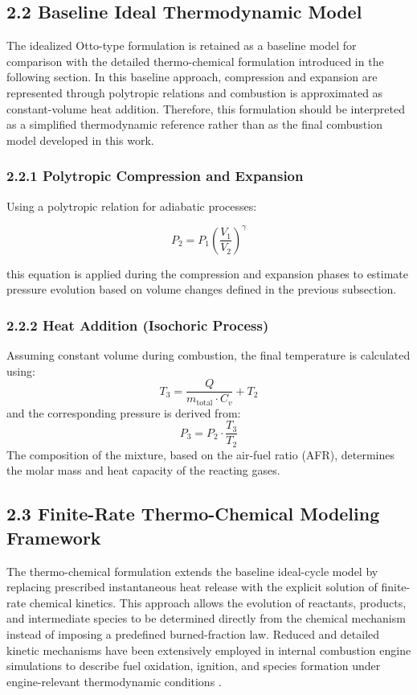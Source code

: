 \documentclass[man,floatsintext,noextraspace]{apa6}
\begin{document}
\subsection{2.2 Baseline Ideal Thermodynamic Model}
The idealized Otto-type formulation is retained as a baseline model for comparison with the detailed thermo-chemical formulation introduced in the following section. In this baseline approach, compression and expansion are represented through polytropic relations and combustion is approximated as constant-volume heat addition. Therefore, this formulation should be interpreted as a simplified thermodynamic reference rather than as the final combustion model developed in this work.

\subsubsection{2.2.1 Polytropic Compression and Expansion}

Using a polytropic relation for adiabatic processes:

\begin{equation}
    P_2 = P_1 \left( \frac{V_1}{V_2} \right)^\gamma
\end{equation}

this equation is applied during the compression and expansion phases to estimate pressure evolution based on volume changes defined in the previous subsection.

\subsubsection{2.2.2 Heat Addition (Isochoric Process)}
Assuming constant volume during combustion, the final temperature is calculated using:
\begin{equation}
T_3 = \frac{Q}{m_{\text{total}} \cdot C_v} + T_2
\end{equation}
and the corresponding pressure is derived from:
\begin{equation}
P_3 = P_2 \cdot \frac{T_3}{T_2}
\end{equation}
The composition of the mixture, based on the air-fuel ratio (AFR), determines the molar mass and heat capacity of the reacting gases.


\subsection{2.3 Finite-Rate Thermo-Chemical Modeling Framework}

The thermo-chemical formulation extends the baseline ideal-cycle model by replacing prescribed instantaneous heat release with the explicit solution of finite-rate chemical kinetics. This approach allows the evolution of reactants, products, and intermediate species to be determined directly from the chemical mechanism instead of imposing a predefined burned-fraction law. Reduced and detailed kinetic mechanisms have been extensively employed in internal combustion engine simulations to describe fuel oxidation, ignition, and species formation under engine-relevant thermodynamic conditions
\cite{RaReitz2008,Mehl2009}.
\end{document}
